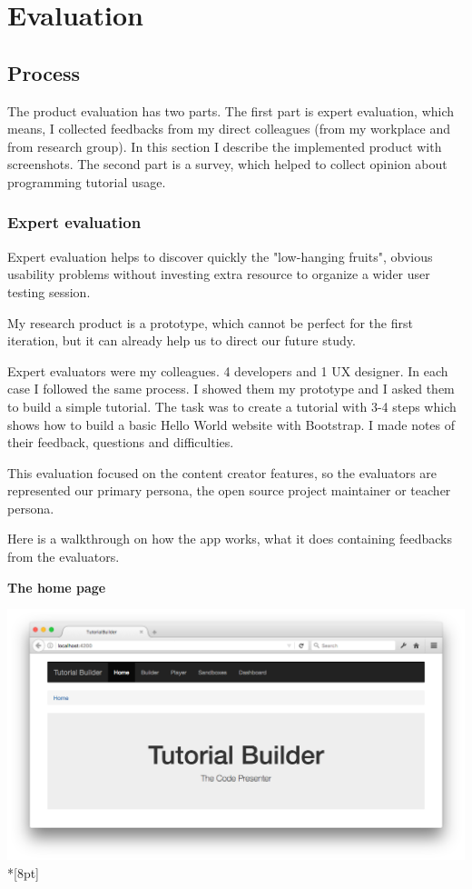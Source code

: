 \documentclass[11pt, a4paper, oneside, openright, medskipamount]{report}
\begin{document}
\chapter{Evaluation}

\section{Process}

The product evaluation has two parts. The first part is expert evaluation, which means, I collected feedbacks from my direct colleagues (from my workplace and from research group). In this section I describe the implemented product with screenshots. The second part is a survey, which helped to collect opinion about programming tutorial usage.

\subsection{Expert evaluation}

Expert evaluation helps to discover quickly the "low-hanging fruits", obvious usability problems without investing extra resource to organize a wider user testing session.

My research product is a prototype, which cannot be perfect for the first iteration, but it can already help us to direct our future study.

Expert evaluators were my colleagues. 4 developers and 1 UX designer. In each case I followed the same process. I showed them my prototype and I asked them to build a simple tutorial. The task was to create a tutorial with 3-4 steps which shows how to build a basic Hello World website with Bootstrap. I made notes of their feedback, questions and difficulties.

This evaluation focused on the content creator features, so the evaluators are represented our primary persona, the open source project maintainer or teacher persona.

Here is a walkthrough on how the app works, what it does containing feedbacks from the evaluators.

\newpage

\textbf{The home page}

\includegraphics[width=1\textwidth]{assets/tour-screenshots/home-page.png}\\*[8pt]
\end{document}
